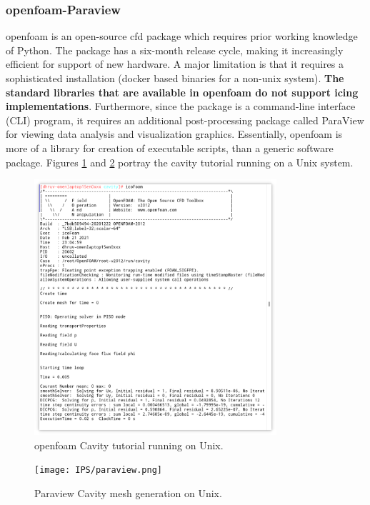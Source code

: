 \documentclass[english]{kththesis}
\begin{document}
\subsubsection {\acrshort{openfoam}-Paraview}
\acrshort{openfoam} is an open-source \acrshort{cfd} package which requires prior working knowledge of Python. The package has a six-month release cycle, making it increasingly efficient for support of new hardware. A major limitation is that it requires a sophisticated installation (docker based binaries for a non-unix system). \textbf{The standard libraries that are available in \acrshort{openfoam} do not support icing implementations}. Furthermore, since the package is a command-line interface (CLI) program, it requires an additional post-processing package called ParaView for viewing data analysis and visualization graphics. Essentially, \acrshort{openfoam} is more of a library for creation of executable scripts, than a generic software package. Figures \ref{fig:openfoam} and \ref{fig:paraview} portray the cavity tutorial running on a Unix system.
\begin{figure}[!ht]
    \centering
    \includegraphics[width=0.8\textwidth]{IPS/openfoam.png}
    \caption{\acrshort{openfoam} Cavity tutorial running on Unix.}
    \label{fig:openfoam}
\end{figure}
\begin{figure}[!htb]
    \centering
    \texttt{[image: IPS/paraview.png]}
    \caption{Paraview Cavity mesh generation on Unix.}
    \label{fig:paraview}
\end{figure}
\end{document}
